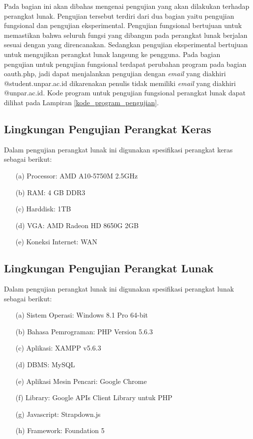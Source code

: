 Pada bagian ini akan dibahas mengenai pengujian yang akan dilakukan terhadap perangkat lunak. Pengujian tersebut terdiri dari dua bagian yaitu pengujian fungsional dan pengujian eksperimental. Pengujian fungsional bertujuan untuk memastikan bahwa seluruh fungsi yang dibangun pada perangkat lunak berjalan sesuai dengan yang direncanakan. Sedangkan pengujian eksperimental bertujuan untuk mengujikan perangkat lunak langsung ke pengguna. Pada bagian pengujian untuk pengujian fungsional terdapat perubahan program pada bagian oauth.php, jadi dapat menjalankan pengujian dengan {\it email} yang diakhiri @student.unpar.ac.id dikarenakan penulis tidak memiliki {\it email} yang diakhiri @unpar.ac.id. Kode program untuk pengujian fungsional perangkat lunak dapat dilihat pada Lampiran \ref{kode_program_pengujian}.

\subsection{Lingkungan Pengujian Perangkat Keras}
\label{sec:lingkunganpengujianperangkatkeras}

Dalam pengujian perangkat lunak ini digunakan spesifikasi perangkat keras sebagai berikut:

\begin{enumerate}
\item[(a)] Processor: AMD A10-5750M 2.5GHz
\item[(b)] RAM: 4 GB DDR3
\item[(c)] Harddisk: 1TB
\item[(d)] VGA: AMD Radeon HD 8650G 2GB
\item[(e)] Koneksi Internet: WAN
\end{enumerate}

\subsection{Lingkungan Pengujian Perangkat Lunak}
\label{sec:lingkunganpengujianperangkatlunak}

Dalam pengujian perangkat lunak ini digunakan spesifikasi perangkat lunak sebagai berikut:

\begin{enumerate}
\item[(a)] Sistem Operasi: Windows 8.1 Pro 64-bit
\item[(b)] Bahasa Pemrograman: PHP Version 5.6.3
\item[(c)] Aplikasi: XAMPP v5.6.3
\item[(d)] DBMS: MySQL
\item[(e)] Aplikasi Mesin Pencari: Google Chrome
\item[(f)] Library: Google APIs Client Library untuk PHP
\item[(g)] Javascript: Strapdown.js
\item[(h)] Framework: Foundation 5
\end{enumerate}

